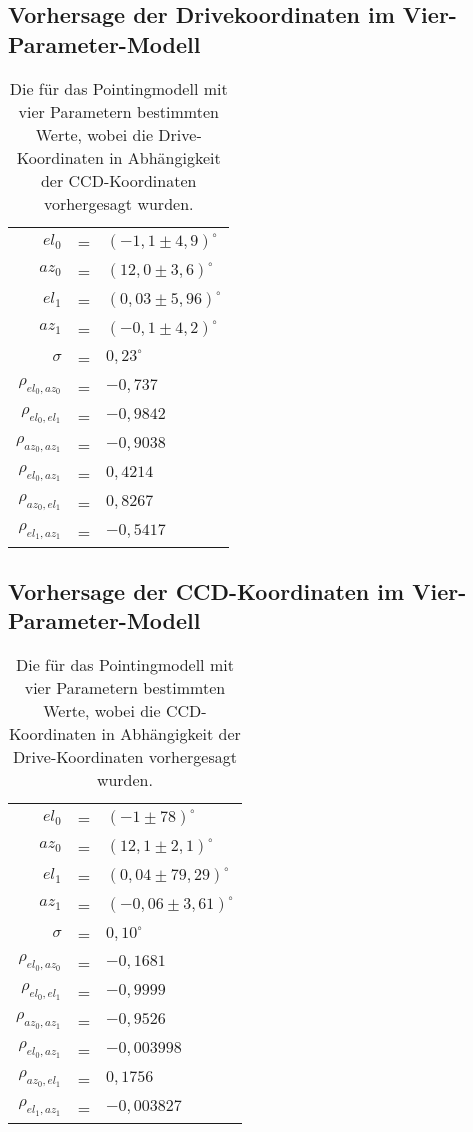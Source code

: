\subsection*{Vorhersage der Drivekoordinaten im Vier-Parameter-Modell}
\begin{table}[htbp]
\centering
\begin{tabular}{rcl}
\toprule
$el_0$ &=& $(-1,1\pm 4,9)^{\circ}$\\
$az_0$ &=& $(12,0\pm3,6)^{\circ}$\\
$el_1$ &=& $(0,03\pm 5,96)^{\circ}$\\
$az_1$ &=& $(-0,1\pm4,2)^{\circ}$\\
$\sigma$ &=& $0,23^{\circ}$\\
$\rho_{el_0,az_0}$ &=& $-0,737$\\
$\rho_{el_0,el_1}$ &=& $-0,9842$\\
$\rho_{az_0,az_1}$ &=& $-0,9038$\\
$\rho_{el_0,az_1}$ &=& $0,4214$\\
$\rho_{az_0,el_1}$ &=& $0,8267$\\
$\rho_{el_1,az_1}$ &=& $-0,5417$\\
\bottomrule
\end{tabular}
\caption{Die für das Pointingmodell mit vier Parametern bestimmten Werte, wobei die Drive-Koordinaten in Abhängigkeit der CCD-Koordinaten vorhergesagt wurden.}
\label{tab:C2D4-}
\end{table}
\newpage
\subsection*{Vorhersage der CCD-Koordinaten im Vier-Parameter-Modell}
\begin{table}[htbp]
\centering
\begin{tabular}{rcl}
\toprule
$el_0$ &=& $(-1\pm 78)^{\circ}$\\
$az_0$ &=& $(12,1\pm2,1)^{\circ}$\\
$el_1$ &=& $(0,04\pm 79,29)^{\circ}$\\
$az_1$ &=& $(-0,06\pm3,61)^{\circ}$\\
$\sigma$ &=& $0,10^{\circ}$\\
$\rho_{el_0,az_0}$&=& $-0,1681$\\
$\rho_{el_0,el_1}$&=& $-0,9999$\\
$\rho_{az_0,az_1}$&=& $-0,9526$\\
$\rho_{el_0,az_1}$&=& $-0,003998$\\
$\rho_{az_0,el_1}$&=& $0,1756$\\
$\rho_{el_1,az_1}$&=& $-0,003827$\\
\bottomrule
\end{tabular}
\caption{Die für das Pointingmodell mit vier Parametern bestimmten Werte, wobei die CCD-Koordinaten in Abhängigkeit der Drive-Koordinaten vorhergesagt wurden.}
\label{tab:D2C4-}
\end{table}